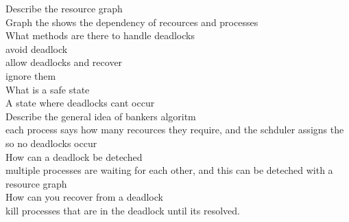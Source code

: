 \documentclass[a4paper,10pt,titlepage]{report}
\begin{document}
Describe the resource graph\\
\hspace{10mm} Graph the shows the dependency of recources and processes \\


What methods are there to handle deadlocks \\
\hspace{10mm} avoid deadlock \\
\hspace{10mm} allow deadlocks and recover \\
\hspace{10mm} ignore them  \\


What is a safe state \\
\hspace{10mm} A state where deadlocks cant occur \\


Describe the general idea of bankers algoritm \\
\hspace{10mm} each process says how many recources they require, and the schduler assigns the so no deadlocks occur\\


How can a deadlock be deteched \\
\hspace{10mm} multiple processes are waiting for each other, and this can be deteched with a resource graph \\


How can you recover from a deadlock\\
\hspace{10mm} kill processes that are in the deadlock until its resolved. \\
\end{document}
